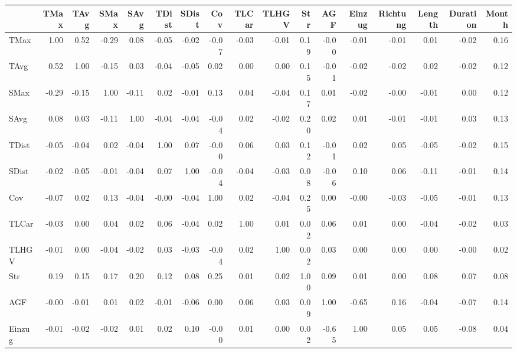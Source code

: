 \begin{tabular}{lrrrrrrrrrrrrrrrr}
\toprule
{} &  TMax &  TAvg &  SMax &  SAvg &  TDist &  SDist &   Cov &  TLCar &  TLHGV &  Str &   AGF &  Einzug &  Richtung &  Length &  Duration &  Month \\
\midrule
TMax     &  1.00 &  0.52 & -0.29 &  0.08 &  -0.05 &  -0.02 & -0.07 &  -0.03 &  -0.01 & 0.19 & -0.00 &   -0.01 &     -0.01 &    0.01 &     -0.02 &   0.16 \\
TAvg     &  0.52 &  1.00 & -0.15 &  0.03 &  -0.04 &  -0.05 &  0.02 &   0.00 &   0.00 & 0.15 & -0.01 &   -0.02 &     -0.02 &    0.02 &     -0.02 &   0.12 \\
SMax     & -0.29 & -0.15 &  1.00 & -0.11 &   0.02 &  -0.01 &  0.13 &   0.04 &  -0.04 & 0.17 &  0.01 &   -0.02 &     -0.00 &   -0.01 &      0.00 &   0.12 \\
SAvg     &  0.08 &  0.03 & -0.11 &  1.00 &  -0.04 &  -0.04 & -0.04 &   0.02 &  -0.02 & 0.20 &  0.02 &    0.01 &     -0.01 &   -0.01 &      0.03 &   0.13 \\
TDist    & -0.05 & -0.04 &  0.02 & -0.04 &   1.00 &   0.07 & -0.00 &   0.06 &   0.03 & 0.12 & -0.01 &    0.02 &      0.05 &   -0.05 &     -0.02 &   0.15 \\
SDist    & -0.02 & -0.05 & -0.01 & -0.04 &   0.07 &   1.00 & -0.04 &  -0.04 &  -0.03 & 0.08 & -0.06 &    0.10 &      0.06 &   -0.11 &     -0.01 &   0.14 \\
Cov      & -0.07 &  0.02 &  0.13 & -0.04 &  -0.00 &  -0.04 &  1.00 &   0.02 &  -0.04 & 0.25 &  0.00 &   -0.00 &     -0.03 &   -0.05 &     -0.01 &   0.13 \\
TLCar    & -0.03 &  0.00 &  0.04 &  0.02 &   0.06 &  -0.04 &  0.02 &   1.00 &   0.01 & 0.02 &  0.06 &    0.01 &      0.00 &   -0.04 &     -0.02 &   0.03 \\
TLHGV    & -0.01 &  0.00 & -0.04 & -0.02 &   0.03 &  -0.03 & -0.04 &   0.02 &   1.00 & 0.02 &  0.03 &    0.00 &      0.00 &    0.00 &     -0.00 &   0.02 \\
Str      &  0.19 &  0.15 &  0.17 &  0.20 &   0.12 &   0.08 &  0.25 &   0.01 &   0.02 & 1.00 &  0.09 &    0.01 &      0.00 &    0.08 &      0.07 &   0.08 \\
AGF      & -0.00 & -0.01 &  0.01 &  0.02 &  -0.01 &  -0.06 &  0.00 &   0.06 &   0.03 & 0.09 &  1.00 &   -0.65 &      0.16 &   -0.04 &     -0.07 &   0.14 \\
Einzug   & -0.01 & -0.02 & -0.02 &  0.01 &   0.02 &   0.10 & -0.00 &   0.01 &   0.00 & 0.02 & -0.65 &    1.00 &      0.05 &    0.05 &     -0.08 &   0.04 \\

\end{tabular}
